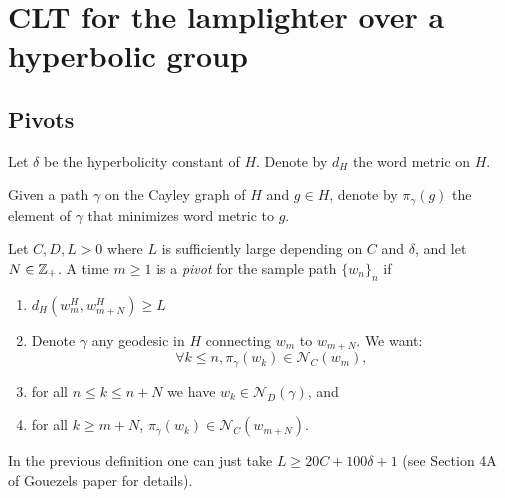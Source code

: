 \section{CLT for the lamplighter over a hyperbolic group}

%
%

\subsection{Pivots}
Let $\delta$ be the hyperbolicity constant of $H$. Denote by $d_H$ the word metric on $H$.

Given a path $\gamma$ on the Cayley graph of $H$ and $g\in H$, denote by $\pi_{\gamma}(g)$ the element of $\gamma$ that minimizes word metric to $g$.

\begin{defn}
	Let $C,D,L>0$ where $L$ is sufficiently large depending on $C$ and $\delta$, and let $N\in \mathbb{Z}_{+}$. A time $m\ge 1$ is a \emph{pivot} for the sample path $\{w_n\}_{n}$ if   
	\begin{enumerate}
		\item $d_{H}(w^{H}_m,w^{H}_{m+N})\ge L$
		\item Denote $\gamma$ any geodesic in $H$ connecting $w_m$ to $w_{m+N}.$ We want: 
		\[ \forall k\le n, \pi_{\gamma}(w_k)\in \mathcal{N}_{C}(w_m),
		\]
		\item for all $n\le k\le n+N$ we have $w_k\in \mathcal{N}_{D}(\gamma)$, and
		\item for all $k\ge m+N$, $\pi_{\gamma}(w_k)\in \mathcal{N}_{C}(w_{m+N})$.
	\end{enumerate}
\end{defn}
In the previous definition one can just take $L\ge 20C+100\delta+1$ (see Section 4A of Gouezels paper for details).

